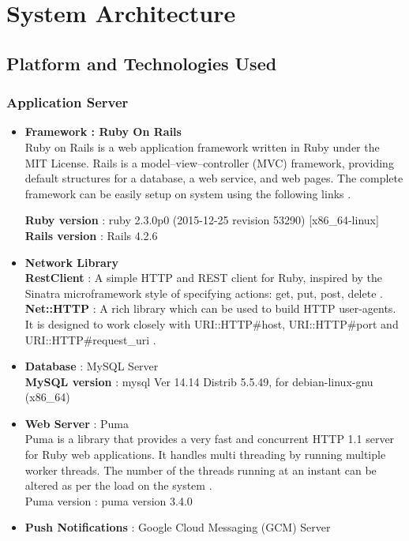\chapter{System Architecture}

\section{Platform and Technologies Used}
\subsection{Application Server}
\begin{itemize}
\item \textbf{Framework : Ruby On Rails}\\
Ruby on Rails is a web application framework written in Ruby under the MIT License. Rails is a model–view–controller (MVC) framework, providing default structures for a database, a web service, and web pages. The complete framework can be easily setup on system using the following links \cite{Setup43:online} \cite{RVM:R7:online}.

\textbf{Ruby version} : ruby 2.3.0p0 (2015-12-25 revision 53290) [x86\_64-linux] \\
\textbf{Rails version} : Rails 4.2.6

\item \textbf{Network Library} \\
\textbf{RestClient} : A simple HTTP and REST client for Ruby, inspired by the Sinatra microframework style of specifying actions: get, put, post, delete \cite{GitHu91:online}.\\
\textbf{Net::HTTP} : A rich library which can be used to build HTTP user-agents. It is designed to work closely with URI::HTTP\#host, URI::HTTP\#port and URI::HTTP\#request\_uri  \cite{Class28:online}.
\item \textbf{Database} : MySQL Server \\ 
\textbf{MySQL version} : mysql  Ver 14.14 Distrib 5.5.49, for debian-linux-gnu (x86\_64)
\item \textbf{Web Server} :  Puma\\
Puma is a library that provides a very fast and concurrent HTTP 1.1 server for Ruby web applications. It handles multi threading by running multiple worker threads. The number of the threads running at an instant can be altered as per the load on the system \cite{AMode24:online}.\\
Puma version : puma version 3.4.0

\item \textbf{Push Notifications} : Google Cloud Messaging (GCM) Server
\end{itemize}


